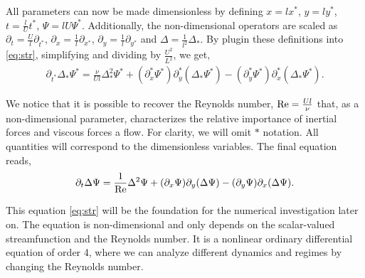 All parameters can now be made dimensionless by defining $x = l x^*$, $y = l
y^*$, $t = \frac{l}{U} t^*$, $\Psi = lU \Psi^*$. Additionally, the
non-dimensional operators are scaled as $\partial_t = \frac{U}{l}
\partial_{t^*}$, $\partial_x = \frac{1}{l} \partial_{x^*}$, $\partial_y =
\frac{1}{l} \partial_{y^*}$ and $\Delta = \frac{1}{l^2} \Delta_{*}$. By
plugin these definitions into \eqref{eq:str}, simplifying and dividing by
$\frac{U^2}{L^2}$, we get,
\begin{align}
\partial_{t^*} \Delta_* \Psi^* = \frac{\nu}{Ul} \Delta^2_* \Psi^*
  + (\partial_x^* \Psi^*) \partial_y^*(\Delta_* \Psi^*)
  - (\partial_y^* \Psi^*) \partial_x^*(\Delta_* \Psi^*). 
\end{align}

We notice that it is possible to recover the Reynolds number, $\mathrm{Re} =
\frac{Ul}{\nu}$ that, as a non-dimensional parameter, characterizes the
relative importance of inertial forces and viscous forces a flow. For clarity,
we will omit $*$ notation. All quantities will correspond to the dimensionless
variables. The final equation reads,
\vspace{-5pt}
\begin{align}
\partial_t \Delta \Psi = \frac{1}{\mathrm{Re}} \Delta^2 \Psi
  + (\partial_x \Psi) \partial_y(\Delta \Psi)
  - (\partial_y \Psi) \partial_x(\Delta \Psi). \label{eq:str}
\end{align}

This equation \eqref{eq:str} will be the foundation for the numerical
investigation later on. The equation is non-dimensional and only depends on the
scalar-valued streamfunction and the Reynolds number. It is a nonlinear
ordinary differential equation of order 4, where we can analyze different
dynamics and regimes by changing the Reynolds number.
